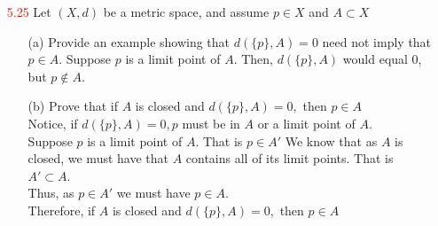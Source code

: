 \documentclass[12pt]{article}
\begin{document}
\begin{enumerate}
		\item[\textcolor{red}{5.25}] Let $( X , d )$ be a metric space, and assume $p \in X$ and $A \subset X$
		\begin{enumerate}
			\item[(a)] Provide an example showing that $d ( \{ p \} , A ) = 0$ need not imply that $p \in A .$
			Suppose $ p $ is a limit point of $ A $. Then, $ d(\{p\},A) $ would equal 0, but $ p\not\in A $.
			\item[(b)] Prove that if $A$ is closed and $d ( \{ p \} , A ) = 0 ,$ then $p \in A$\\
			Notice, if $ d(\{p\},A)=0 , p$ must be in $ A $ or a limit point of $ A $. \\
			Suppose $ p $ is a limit point of $ A $. That is $ p\in A' $ We know that as $ A $ is closed, we must have that $ A $ contains all of its limit points. That is $ A'\subset A $.\\
			Thus, as $ p\in A' $ we must have $ p\in A $.\\
			Therefore, if $A$ is closed and $d ( \{ p \} , A ) = 0 ,$ then $p \in A$
		\end{enumerate}
		

\end{enumerate}
\end{document}
